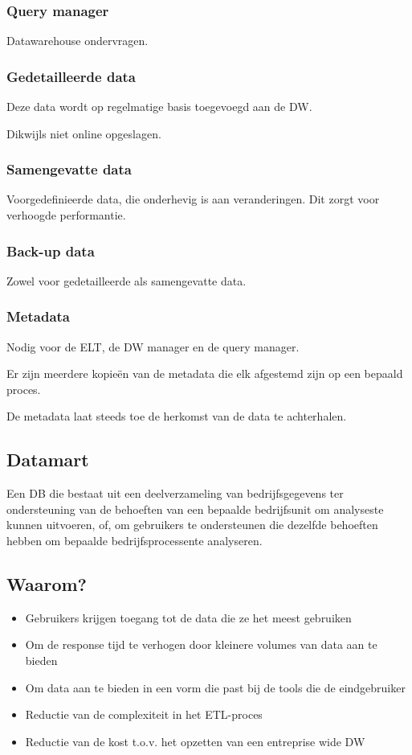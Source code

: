 \documentclass[a4paper,12pt]{article}
\begin{document}
\subsubsection{Query manager}
Datawarehouse ondervragen.

\subsubsection{Gedetailleerde data}
Deze data wordt op regelmatige basis toegevoegd aan de DW.

Dikwijls niet online opgeslagen.

\subsubsection{Samengevatte data}
Voorgedefinieerde data, die onderhevig is aan veranderingen.
Dit zorgt voor verhoogde performantie.

\subsubsection{Back-up data}
Zowel voor gedetailleerde als samengevatte data.

\subsubsection{Metadata}
Nodig voor de ELT, de DW manager en de query manager.

Er zijn meerdere kopieën van de metadata die elk afgestemd zijn op een bepaald proces.

De metadata laat steeds toe de herkomst van de data te achterhalen.

\subsection{Datamart}
Een DB die bestaat uit een deelverzameling van bedrijfsgegevens ter ondersteuning van de behoeften van een bepaalde bedrijfsunit om analyseste kunnen uitvoeren, of, om gebruikers te ondersteunen die dezelfde behoeften hebben om bepaalde bedrijfsprocessente analyseren.

\subsection{Waarom?}
\begin{itemize}
\item Gebruikers krijgen toegang tot de data die ze het meest gebruiken
\item Om de response tijd te verhogen door kleinere volumes van data aan te bieden
\item Om data aan te bieden in een vorm die past bij de tools die de eindgebruiker
\item Reductie van de complexiteit in het ETL-proces
\item Reductie van de kost t.o.v. het opzetten van een entreprise wide DW
\end{itemize}
\end{document}
